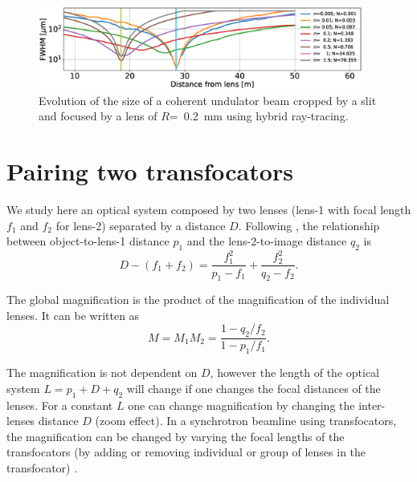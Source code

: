 \documentclass{iucr}              %
\begin{document}
\begin{figure}
    \centering
    
    \includegraphics[width=0.95\textwidth]{figures/oneTF_ShadowHybrid_R200um.eps}
    
    \caption{Evolution of the size of a coherent undulator beam cropped by a slit and focused by a lens of $R$=~\SI{0.2}{\milli\meter} using hybrid ray-tracing.
    }
    \label{fig:oneTF_hybrid}
\end{figure}



\section{Pairing two transfocators}\label{sec:twolenses}


We study here an optical system composed by two lenses (lens-1 with focal length $f_1$ and $f_2$ for lens-2) separated by a distance $D$. Following \cite{Goodman85}, the relationship between object-to-lens-1 distance $p_1$ and the lens-2-to-image distance $q_2$ is
\begin{equation}
\label{eq:twolens}
    D-(f_1+f_2)=\frac{f_1^2}{p_1-f_1} + \frac{f_2^2}{q_2-f_2}.
\end{equation}

The global magnification is the product of the magnification of the individual lenses. It can be written as
\begin{equation}
\label{eq:magnification}
    M=M_1 M_2=\frac{1-q_2/f_2}{1-p_1/f_1}.
\end{equation}

The magnification is not dependent on $D$, however the length of the optical system $L=p_1+D+q_2$ will change if one changes the focal distances of the lenses. For a constant $L$ one can change magnification by changing the inter-lenses distance $D$ (zoom effect). In a synchrotron beamline using transfocators, the magnification can be changed by varying the focal lengths of the transfocators (by adding or removing individual or group of lenses in the transfocator) \cite{Vaughan:kv5084}.
\end{document}
